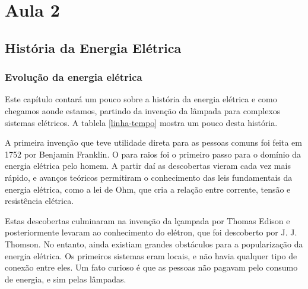\section{Aula 2}

\subsection{História da Energia Elétrica}


\subsubsection{Evolução da energia elétrica}

Este capítulo contará um pouco sobre a história da energia elétrica e como chegamos aonde estamos, partindo da invenção da lâmpada para complexos sistemas elétricos. A tablela \ref{linha-tempo} mostra um pouco desta história.

A primeira invenção que teve utilidade direta para as pessoas comuns foi feita em 1752 por Benjamin Franklin. O para raios foi o primeiro passo para o domínio da energia elétrica pelo homem. A partir daí as descobertas vieram cada vez mais rápido, e avanços teóricos permitiram o conhecimento das leis fundamentais da energia elétrica, como a lei de Ohm, que cria a relação entre corrente, tensão e resistência elétrica.

Estas descobertas culminaram na invenção da lçampada por Thomas Edison e posteriormente levaram ao conhecimento do elétron, que foi descoberto por J. J. Thomson. No entanto, ainda existiam grandes obstáculos para a popularização da energia elétrica. Os primeiros sistemas eram locais, e não havia qualquer tipo de conexão entre eles. Um fato curioso é que as pessoas não pagavam pelo consumo de energia, e sim pelas lâmpadas. 


